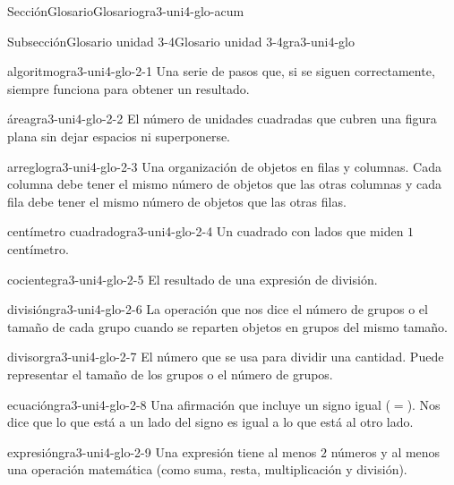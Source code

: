 \documentclass[twoside,10pt,]{article}
\begin{document}
\begin{sectionptx}{Sección}{Glosario}{}{Glosario}{}{}{gra3-uni4-glo-acum}
%
%
\typeout{************************************************}
\typeout{************************************************}
%
\begin{subsectionptx}{Subsección}{Glosario unidad 3-4}{}{Glosario unidad 3-4}{}{}{gra3-uni4-glo}
%
\begin{descriptionlist}
\begin{dlimedium}{algoritmo}{gra3-uni4-glo-2-1}%
Una serie de pasos que, si se siguen correctamente, siempre funciona para obtener un resultado.%
\end{dlimedium}%
\begin{dlimedium}{área}{gra3-uni4-glo-2-2}%
El número de unidades cuadradas que cubren una figura plana sin dejar espacios ni superponerse.%
\end{dlimedium}%
\begin{dlimedium}{arreglo}{gra3-uni4-glo-2-3}%
Una organización de objetos en filas y columnas. Cada columna debe tener el mismo número de objetos que las otras columnas y cada fila debe tener el mismo número de objetos que las otras filas.%
\end{dlimedium}%
\begin{dlimedium}{centímetro cuadrado}{gra3-uni4-glo-2-4}%
Un cuadrado con lados que miden \(1\) centímetro.%
\end{dlimedium}%
\begin{dlimedium}{cociente}{gra3-uni4-glo-2-5}%
El resultado de una expresión de división.%
\end{dlimedium}%
\begin{dlimedium}{división}{gra3-uni4-glo-2-6}%
La operación que nos dice el número de grupos o el tamaño de cada grupo cuando se reparten objetos en grupos del mismo tamaño.%
\end{dlimedium}%
\begin{dlimedium}{divisor}{gra3-uni4-glo-2-7}%
El número que se usa para dividir una cantidad. Puede representar el tamaño de los grupos o el número de grupos.%
\end{dlimedium}%
\begin{dlimedium}{ecuación}{gra3-uni4-glo-2-8}%
Una afirmación que incluye un signo igual (\(=\)). Nos dice que lo que está a un lado del signo es igual a lo que está al otro lado.%
\end{dlimedium}%
\begin{dlimedium}{expresión}{gra3-uni4-glo-2-9}%
Una expresión tiene al menos \(2\) números y al menos una operación matemática (como suma, resta, multiplicación y división).%

\end{dlimedium}
\end{descriptionlist}
\end{subsectionptx}
\end{sectionptx}
\end{document}
